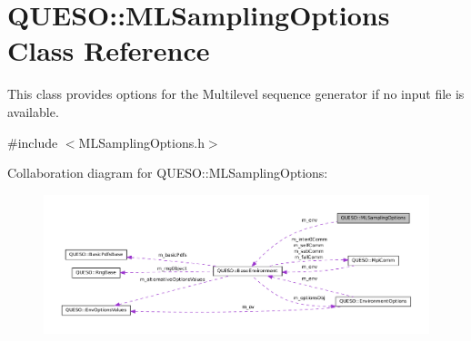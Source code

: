 \hypertarget{class_q_u_e_s_o_1_1_m_l_sampling_options}{\section{Q\-U\-E\-S\-O\-:\-:M\-L\-Sampling\-Options Class Reference}
\label{class_q_u_e_s_o_1_1_m_l_sampling_options}
}


This class provides options for the Multilevel sequence generator if no input file is available.  




{\ttfamily \#include $<$M\-L\-Sampling\-Options.\-h$>$}



Collaboration diagram for Q\-U\-E\-S\-O\-:\-:M\-L\-Sampling\-Options\-:
\nopagebreak
\begin{figure}[H]
\begin{center}
\leavevmode
\includegraphics[width=350pt]{class_q_u_e_s_o_1_1_m_l_sampling_options__coll__graph}
\end{center}
\end{figure}
